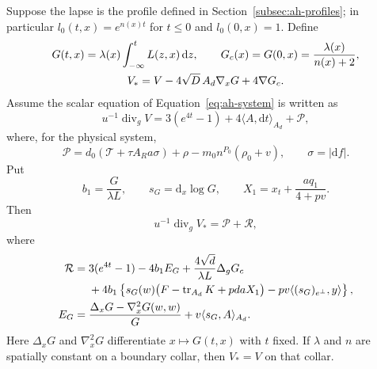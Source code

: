 \begin{proposition}
\label{prop:ah-alg-primitive}
Suppose the lapse is the profile defined in
Section~\ref{subsec:ah-profiles}; in particular
\(l_0(t,x)=e^{n(x)t}\) for \(t\le0\) and \(l_0(0,x)=1\).
Define
\begin{gather}
 G(t,x)=\lambda(x)\int_{-\infty}^t L(z,x)\,\mathrm dz,\qquad
 G_c(x)=G(0,x)=\frac{\lambda(x)}{n(x)+2},\notag\\
 V_*=V-4\sqrt D\,A_d\nabla_xG+4\nabla G_c .
 \label{eq:ah-alg-primitive-definitions}
\end{gather}
Assume the scalar equation of Equation~\eqref{eq:ah-system} is written
as
\[
 u^{-1}\operatorname{div}_gV
 =3(e^{4t}-1)+4\langle A,\mathrm dt\rangle_{A_d}+\mathcal P,
\]
where, for the physical system,
\[
 \mathcal P=d_0(\mathcal T+\tau A_Ra\sigma)
            +\rho-m_0 n^{P_0}(\rho_0+v),\qquad \sigma=|\mathrm df|.
\]
Put
\[
 b_1=\frac{G}{\lambda L},\qquad
 s_G=\mathrm d_x\log G,\qquad
 X_1=x_t+\frac{a q_1}{4+pv}.
\]
Then
\begin{equation}
 u^{-1}\operatorname{div}_gV_*=\mathcal P+\mathcal R,
 \label{eq:ah-alg-primitive-divergence}
\end{equation}
where
\begin{align}
 \mathcal R={}&3(e^{4t}-1)-4b_1E_G
           +\frac{4\sqrt d}{\lambda L}\Delta_gG_c\notag\\
 &+4b_1\left\{
       s_G(w)\bigl(F-\operatorname{tr}_{A_d}K+pdaX_1\bigr)
       -pv\langle(s_G)_{e^\perp},y\rangle
       \right\},
 \label{eq:ah-alg-primitive-residual}\\
 E_G={}&\frac{\Delta_xG-\nabla_x^2G(w,w)}{G}
              +v\langle s_G,A\rangle_{A_d}.
 \label{eq:ah-alg-EG}
\end{align}
Here \(\Delta_xG\) and \(\nabla_x^2G\) differentiate \(x\mapsto
G(t,x)\) with \(t\) fixed.  If \(\lambda\) and \(n\) are spatially
constant on a boundary collar, then \(V_*=V\) on that collar.
\end{proposition}

